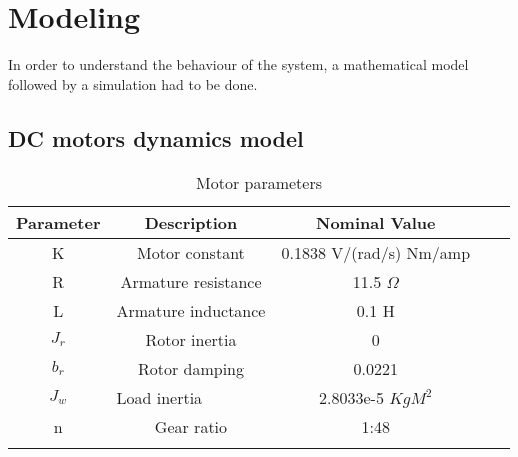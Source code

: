 \chapter{Modeling}\label{ch:modeling}


In order to understand the behaviour of the system, a mathematical model followed by a simulation had to be done. 

\section{DC motors dynamics model} 

\begin{table}[h]
\centering
\begin{tabular}{cccll}
\hline
Parameter                   & Description                               & Nominal Value                                 &  &  \\ \hline
\multicolumn{1}{|c|}{K}     & \multicolumn{1}{c|}{Motor constant}       & \multicolumn{1}{c|}{0.1838 V/(rad/s)  Nm/amp} &  &  \\ \cline{1-3}
\multicolumn{1}{|c|}{R}     & \multicolumn{1}{c|}{Armature resistance}  & \multicolumn{1}{c|}{11.5 $\Omega$}            &  &  \\ \cline{1-3}
\multicolumn{1}{|c|}{L}     & \multicolumn{1}{c|}{Armature inductance}  & \multicolumn{1}{c|}{0.1 H}                    &  &  \\ \cline{1-3}
\multicolumn{1}{|c|}{$J_r$} & \multicolumn{1}{c|}{Rotor inertia}       & \multicolumn{1}{c|}{0}                        &  &  \\ \cline{1-3}
\multicolumn{1}{|c|}{$b_r$} & \multicolumn{1}{c|}{Rotor damping}        & \multicolumn{1}{c|}{0.0221}                   &  &  \\ \cline{1-3}
\multicolumn{1}{|c|}{$J_w$} & \multicolumn{1}{l|}{Load inertia} & \multicolumn{1}{c|}{2.8033e-5 $KgM^2$}        &  &  \\ \cline{1-3}
\multicolumn{1}{|c|}{n}     & \multicolumn{1}{c|}{Gear ratio}           & \multicolumn{1}{c|}{1:48}                     &  &  \\ \cline{1-3}
\multicolumn{1}{l}{}        & \multicolumn{1}{l}{}                      & \multicolumn{1}{l}{}                          &  &  \\ \hline
\end{tabular}
\caption{Motor parameters}
\label{my-label}
\end{table}


